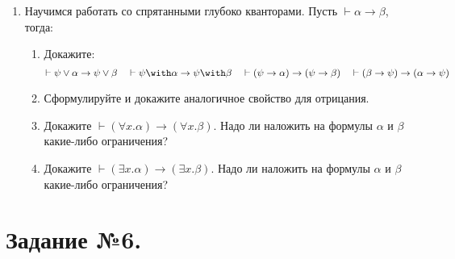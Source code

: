 \documentclass[10pt,a4paper,oneside]{article}
\begin{document}
\begin{enumerate}

\item Научимся работать со спрятанными глубоко кванторами. Пусть $\vdash\alpha\rightarrow\beta$, тогда:
\begin{enumerate}
\item Докажите: $$\vdash\psi\vee\alpha \rightarrow \psi\vee\beta\quad\vdash\psi\with\alpha \rightarrow \psi\with\beta\quad
\vdash(\psi\rightarrow\alpha) \rightarrow (\psi\rightarrow\beta)\quad\vdash(\beta\rightarrow\psi) \rightarrow (\alpha\rightarrow\psi)$$
\item Сформулируйте и докажите аналогичное свойство для отрицания.
\item Докажите $\vdash(\forall x.\alpha)\rightarrow(\forall x.\beta)$. 
Надо ли наложить на формулы $\alpha$ и $\beta$ какие-либо ограничения?
\item Докажите $\vdash(\exists x.\alpha)\rightarrow(\exists x.\beta)$. 
Надо ли наложить на формулы $\alpha$ и $\beta$ какие-либо ограничения?
\end{enumerate}

%
%
%
\end{enumerate}

\section*{Задание №6.}
\end{document}
